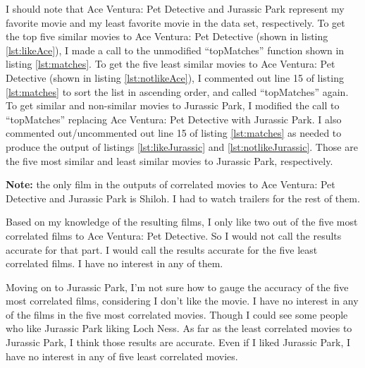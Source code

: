 \documentclass[12pt]{article}
\begin{document}
I should note that Ace Ventura: Pet Detective and Jurassic Park represent my favorite movie and my least favorite movie in the data set, respectively.  To get the top five similar movies to Ace Ventura: Pet Detective (shown in listing \ref{lst:likeAce}), I made a call to the unmodified ``topMatches'' function shown in listing \ref{lst:matches}.  To get the five least similar movies to Ace Ventura: Pet Detective (shown in listing \ref{lst:notlikeAce}), I commented out line 15 of listing \ref{lst:matches} to sort the list in ascending order, and called ``topMatches'' again.  To get similar and non-similar movies to Jurassic Park, I modified the call to ``topMatches'' replacing Ace Ventura: Pet Detective with Jurassic Park.  I also commented out/uncommented out line 15 of listing \ref{lst:matches} as needed to produce the output of listings \ref{lst:likeJurassic} and \ref{lst:notlikeJurassic}.  Those are the five most similar and least similar movies to Jurassic Park, respectively.

\textbf{Note:} the only film in the outputs of correlated movies to Ace Ventura: Pet Detective and Jurassic Park is Shiloh.  I had to watch trailers for the rest of them.

Based on my knowledge of the resulting films, I only like two out of the five most correlated films to Ace Ventura: Pet Detective.  So I would not call the results accurate for that part.  I would call the results accurate for the five least correlated films.  I have no interest in any of them.

Moving on to Jurassic Park,  I'm not sure how to gauge the accuracy of the five most correlated films, considering I don't like the movie.  I have no interest in any of the films in the five most correlated movies.  Though I could see some people who like Jurassic Park liking Loch Ness.  As far as the least correlated movies to Jurassic Park, I think those results are accurate.  Even if I liked Jurassic Park, I have no interest in any of five least correlated movies.
\end{document}
